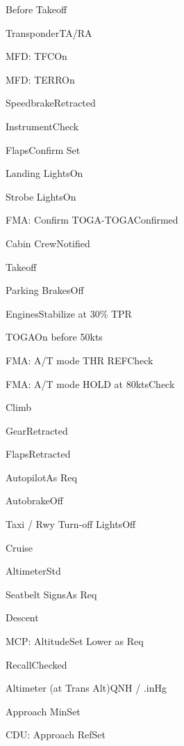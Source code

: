 \documentclass[sim-use, halfpage]{checklist}
\begin{document}
\begin{checklist}{Before Takeoff}
  \item{Transponder}{TA/RA}
  \item{MFD: TFC}{On}
  \item{MFD: TERR}{On}
  \item{Speedbrake}{Retracted}
  \item{Instrument}{Check}
  \item{Flaps}{Confirm Set}
  \item{Landing Lights}{On}
  \item{Strobe Lights}{On}
  \item{FMA: Confirm TOGA-TOGA}{Confirmed}
  \item{Cabin Crew}{Notified}
\end{checklist}

\begin{checklist}{Takeoff}
  \item{Parking Brakes}{Off}
  \item{Engines}{Stabilize at 30\% TPR}
  \item{TOGA}{On before 50kts}
  \item{FMA: A/T mode THR REF}{Check}
  \item{FMA: A/T mode HOLD at 80kts}{Check}
\end{checklist}

\begin{checklist}{Climb}
  \item{Gear}{Retracted}
  \item{Flaps}{Retracted}
  \item{Autopilot}{As Req}
  \item{Autobrake}{Off}
  \item{Taxi / Rwy Turn-off Lights}{Off}
\end{checklist}

\begin{checklist}{Cruise}
  \item{Altimeter}{Std}
  \item{Seatbelt Signs}{As Req}
\end{checklist}

\begin{checklist}{Descent}
  \item{MCP: Altitude}{Set Lower as Req}
  \item{Recall}{Checked}
  \item{Altimeter (at Trans Alt)}{\blank QNH / \blank.\blank inHg}
  \item{Approach Min}{Set}
  \item{CDU: Approach Ref}{Set}
\end{checklist}
\end{document}
